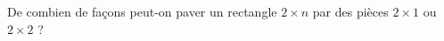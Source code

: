 De combien de façons peut-on paver un rectangle $2 \times n$ par des pièces $2 \times 1$ ou $2 \times 2$ ?
